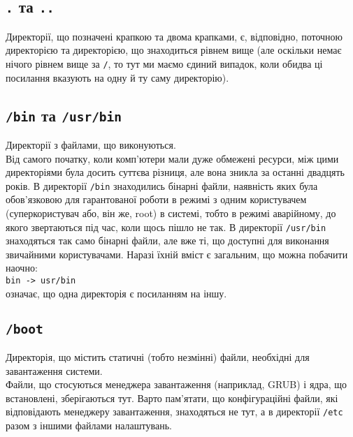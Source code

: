\documentclass[10pt,a4paper]{fancyhandout}
\begin{document}
	\subsection{\texttt{.} та \texttt{..}}
	Директорії, що позначені крапкою та двома крапками, є, відповідно, поточною директорією та директорією, що знаходиться рівнем вище (але оскільки немає нічого рівнем вище за \texttt{/}, то тут ми маємо єдиний випадок, коли обидва ці посилання вказують на одну й ту саму директорію).
	\goodbreak
	
	\subsection{\texttt{/bin} та \texttt{/usr/bin}}
	Директорії з файлами, що виконуються.\\ Від самого початку, коли комп'ютери мали дуже обмежені ресурси, між цими директоріями була досить суттєва різниця, але вона зникла за останні двадцять років. В директорії \texttt{/bin} знаходились бінарні файли, наявність яких була обов'язковою для гарантованої роботи в режимі з одним користувачем (суперкористувач або, він же, root) в системі, тобто в режимі аварійному, до якого звертаються під час, коли щось пішло не так. В директорії \texttt{/usr/bin} знаходяться так само бінарні файли, але вже ті, що доступні для виконання звичайними користувачами. Наразі їхній вміст є загальним, що можна побачити наочно:\\
	\texttt{bin -> usr/bin}\\ означає, що одна директорія є посиланням на іншу.
	\goodbreak
	
	\subsection{\texttt{/boot}}
	Директорія, що містить статичні (тобто незмінні) файли, необхідні для завантаження системи. \\ Файли, що стосуються менеджера завантаження (наприклад, GRUB) і ядра, що встановлені, зберігаються тут. Варто пам'ятати, що конфігураційні файли, які відповідають менеджеру завантаження, знаходяться не тут, а в директорії \texttt{/etc} разом з іншими файлами налаштувань.
	\goodbreak
	
\end{document}
